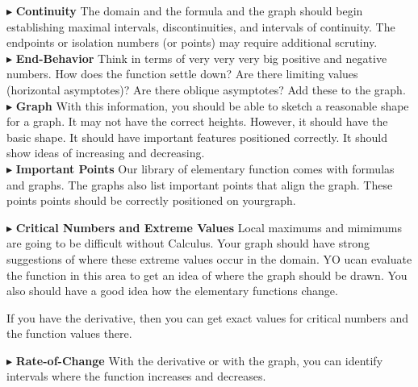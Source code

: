 \documentclass{ximera}
\begin{document}
$\blacktriangleright$ \textbf{Continuity}
The domain and the formula and the graph should begin establishing maximal intervals, discontinuities, and intervals of continuity.  The endpoints or isolation numbers (or points) may require additional scrutiny.  \\


$\blacktriangleright$ \textbf{End-Behavior}
Think in terms of very very very big positive and negative numbers.  How does the function settle down?  Are there limiting values (horizontal asymptotes)?  Are there oblique asymptotes? Add these to the graph. \\


$\blacktriangleright$ \textbf{Graph}
With this information, you should be able to sketch a reasonable shape for a graph.  It may not have the correct heights. However, it should have the basic shape.  It should have important features positioned correctly. It should show ideas of increasing and decreasing. \\


$\blacktriangleright$ \textbf{Important Points}
Our library of elementary function comes with formulas and graphs.  The graphs also list important points that align the graph.  These points points should be correctly positioned on yourgraph.


$\blacktriangleright$ \textbf{Critical Numbers and Extreme Values}
Local maximums and mimimums are going to be difficult without Calculus.  Your graph should have strong suggestions of where these extreme values occur in the domain. YO ucan evaluate the function in this area to get an idea of where the graph should be drawn.  You also should have a good idea how the elementary functions change.

If you have the derivative, then you can get exact values for critical numbers and the function values there.



$\blacktriangleright$ \textbf{Rate-of-Change}
With the derivative or with the graph, you can identify intervals where the function increases and decreases.
\end{document}
